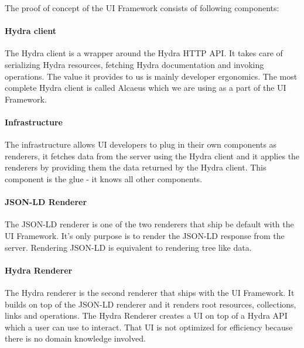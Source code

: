 The proof of concept of the UI Framework consists of following components:

\paragraph{Hydra client}
The Hydra client is a wrapper around the Hydra HTTP API. It takes care of serializing Hydra resources, fetching Hydra documentation and invoking operations. The value it provides to us is mainly developer ergonomics. The most complete Hydra client is called Alcaeus which we are using as a part of the UI Framework.

\paragraph{Infrastructure}
The infrastructure allows UI developers to plug in their own components as renderers, it fetches data from the server using the Hydra client and it applies the renderers by providing them the data returned by the Hydra client. This component is the glue - it knows all other components.

\paragraph{JSON-LD Renderer}
The JSON-LD renderer is one of the two renderers that ship be default with the UI Framework. It's only purpose is to render the JSON-LD response from the server. Rendering JSON-LD is equivalent to rendering tree like data.

\paragraph{Hydra Renderer}
The Hydra renderer is the second renderer that ships with the UI Framework. It builds on top of the JSON-LD renderer and it renders root resources, collections, links and operations. The Hydra Renderer creates a UI on top of a Hydra API which a user can use to interact. That UI is not optimized for efficiency because there is no domain knowledge involved.

